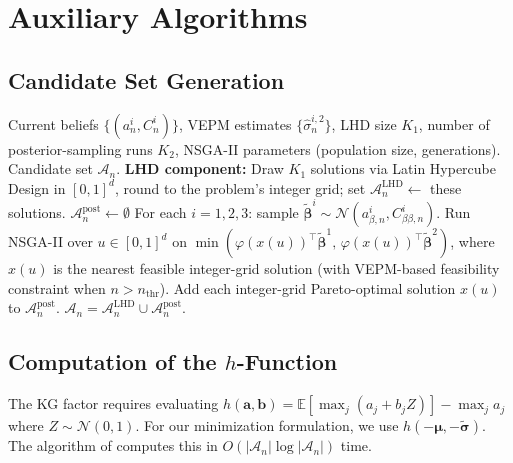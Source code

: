 \documentclass[12pt]{article}
\theoremstyle{plain}
\theoremstyle{definition}
\theoremstyle{remark}
\begin{document}
\section{Auxiliary Algorithms}\label{app:algorithms}

\subsection{Candidate Set Generation}\label{app:candidate_set}

\begin{algorithm}[ht]
\caption{Generate Candidate Set $\mathcal{A}_n$}\label{alg:candidate}
\begin{algorithmic}[1]
\Require Current beliefs $\{(a^i_n, C^i_n)\}$, VEPM estimates
  $\{\hat{\sigma}^{i,2}_n\}$, LHD size $K_1$, number of posterior-sampling
  runs $K_2$, NSGA-II parameters (population size, generations).
\Ensure Candidate set $\mathcal{A}_n$.
\State \textbf{LHD component:} Draw $K_1$ solutions via Latin Hypercube
  Design in $[0,1]^d$, round to the problem's integer grid;
  set $\mathcal{A}^{\mathrm{LHD}}_n \leftarrow$ these solutions.
\State $\mathcal{A}^{\mathrm{post}}_n \leftarrow \emptyset$
  \State For each $i=1,2,3$: sample $\tilde{\boldsymbol{\beta}}^i \sim
    \mathcal{N}(a^i_{\beta,n}, C^i_{\beta\beta,n})$.
  \State Run NSGA-II over $u\in[0,1]^d$ on
    $\min(\varphi(x(u))^\top\tilde{\boldsymbol{\beta}}^1,\,
    \varphi(x(u))^\top\tilde{\boldsymbol{\beta}}^2)$, where $x(u)$ is
    the nearest feasible integer-grid solution
    (with VEPM-based feasibility constraint when $n > n_{\mathrm{thr}}$).
  \State Add each integer-grid Pareto-optimal solution $x(u)$ to
    $\mathcal{A}^{\mathrm{post}}_n$.
\EndFor
\State \Return $\mathcal{A}_n = \mathcal{A}^{\mathrm{LHD}}_n \cup \mathcal{A}^{\mathrm{post}}_n$.
\end{algorithmic}
\end{algorithm}

\subsection{Computation of the \texorpdfstring{$h$}{h}-Function}\label{app:h_function}

The KG factor requires evaluating
$h(\mathbf{a}, \mathbf{b}) = \mathbb{E}[\max_j (a_j + b_j Z)] - \max_j a_j$
where $Z \sim \mathcal{N}(0,1)$.  For our minimization formulation,
we use $h(-\boldsymbol{\mu}, -\tilde{\boldsymbol{\sigma}})$.
The algorithm of \citet{Frazier2009} computes this in
$O(|\mathcal{A}_n| \log |\mathcal{A}_n|)$ time.
\end{document}
